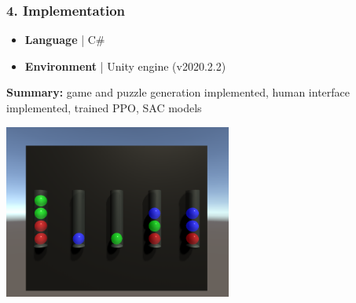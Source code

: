 \documentclass{beamer}
\begin{document}
\begin{frame}
\frametitle{4. Implementation}

\begin{itemize}
  \item \textbf{Language} | C\#
  \item \textbf{Environment} | Unity engine (v2020.2.2)
\end{itemize}

\textbf{Summary:} game and puzzle generation implemented, human interface implemented, trained PPO, SAC models

\begin{center}
  \includegraphics[width=75mm]{img/game-interface.png}
\end{center}

\end{frame}
\end{document}

